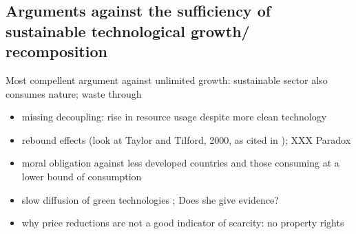 \documentclass[12pt]{article}
\begin{document}
\subsection{Arguments against the sufficiency of sustainable technological growth/ recomposition}
Most compellent argument against unlimited growth: sustainable sector also consumes nature; waste through 
\begin{itemize}
\item missing decoupling: rise in resource usage despite more clean technology \citep{Alexander2012TheContext}
\item rebound effects (look at Taylor and Tilford, 2000, as cited in \cite{Schor2005SustainableReduction}); XXX Paradox \citep{Alexander2012TheContext}
\item moral obligation against less developed countries and those consuming at a lower bound of consumption \citep{Alexander2012TheContext}
\item slow diffusion of green technologies \citep{Schor2005SustainableReduction}; Does she give evidence?
\item why price reductions are not a good indicator of scarcity: no property rights \citep{Schor2005SustainableReduction}
\end{itemize}
\end{document}
